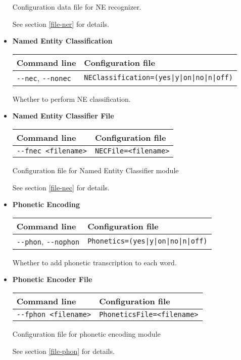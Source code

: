 \documentclass[a4paper]{book}
\begin{document}
\begin{itemize}
  Configuration data file for NE recognizer.

  See section \ref{file-ner} for details.


\item {\bf Named Entity Classification}

\begin{tabular}{|l|l|}
Command line       & Configuration file   \\ \hline
\verb#--nec#, \verb#--nonec#     & \verb#NEClassification=(yes|y|on|no|n|off)#    \\ \hline
\end{tabular}

   Whether to perform NE classification.


\item {\bf Named Entity Classifier File}

\begin{tabular}{|l|l|}
Command line       & Configuration file   \\ \hline
\verb#--fnec <filename>#   & \verb#NECFile=<filename>#  \\ \hline
\end{tabular}

  Configuration file for Named Entity Classifier module

  See section \ref{file-nec} for details.


\item {\bf Phonetic Encoding}

\begin{tabular}{|l|l|}
Command line       & Configuration file   \\ \hline
\verb#--phon#, \verb#--nophon#     & \verb#Phonetics=(yes|y|on|no|n|off)#    \\ \hline
\end{tabular}

   Whether to add phonetic transcription to each word.

\item {\bf Phonetic Encoder File}

\begin{tabular}{|l|l|}
Command line       & Configuration file   \\ \hline
\verb#--fphon <filename>#   & \verb#PhoneticsFile=<filename>#  \\ \hline
\end{tabular}

  Configuration file for phonetic encoding module

  See section \ref{file-phon} for details.



\end{itemize}
\end{document}
